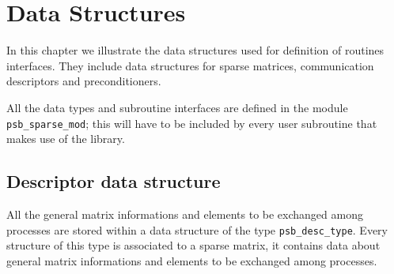 \section{Data Structures}
\label{sec:datastruct}

In this chapter we  illustrate the  data structures used for definition of
routines interfaces. They  include data structures for sparse matrices,
communication descriptors and preconditioners.%

All the data types and subroutine interfaces are defined in the module
\verb|psb_sparse_mod|; this will have to be included by every user
subroutine that makes use of the library. 



\subsection{Descriptor data structure}
\label{sec:desc}
All the general matrix informations and elements to be
exchanged among processes are stored within a data structure of the
type \hypertarget{descdata}{{\tt psb\_desc\_type}}. 
Every structure of this type is associated to a sparse matrix, it
contains data about general matrix informations and elements to be
exchanged among processes.  

